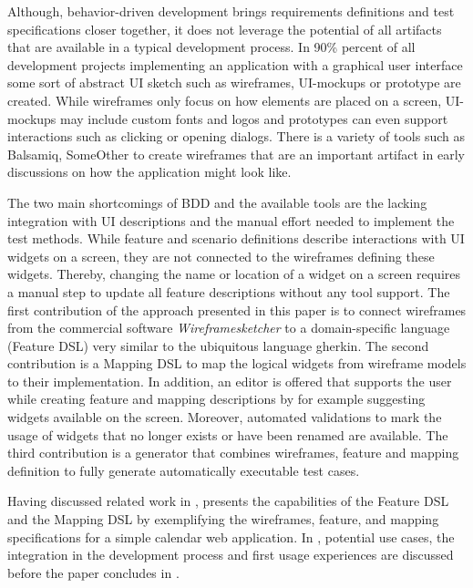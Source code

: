 \documentclass{sig-alternate-05-2015}
\begin{document}
Although, behavior-driven development brings requirements definitions and test specifications closer together, it does not leverage the potential of all artifacts that are available in a typical development process.
In 90\% percent of all development projects implementing an application with a graphical user interface some sort of abstract UI sketch such as wireframes, UI-mockups or prototype are created.
While wireframes only focus on how elements are placed on a screen, UI-mockups may include custom fonts and logos and prototypes can even support interactions such as clicking or opening dialogs. 
There is a variety of tools such as Balsamiq, SomeOther to create wireframes that are an important artifact in early discussions on how the application might look like.

The two main shortcomings of BDD and the available tools are the lacking integration with UI descriptions and the manual effort needed to implement the test methods.
While feature and scenario definitions describe interactions with UI widgets on a screen, they are not connected to the wireframes defining these widgets.
Thereby, changing the name or location of a widget on a screen requires a manual step to update all feature descriptions without any tool support.
The first contribution of the approach presented in this paper is to connect  wireframes from the commercial software \textit{Wireframesketcher} to a domain-specific language (Feature DSL) very similar to the ubiquitous language gherkin. 
The second contribution is a Mapping DSL to map the logical widgets from wireframe models to their implementation.
In addition, an editor is offered that supports the user while creating feature and mapping descriptions by for example suggesting widgets available on the screen.
Moreover, automated validations to mark the usage of widgets that no longer exists or have been renamed are available.
The third contribution is a generator that combines wireframes, feature and mapping definition to fully generate automatically executable test cases.

Having discussed related work in ,  presents the capabilities of the Feature DSL and the Mapping DSL by exemplifying the wireframes, feature, and mapping specifications for a simple calendar web application.
In , potential use cases, the integration in the development process and first usage experiences are discussed before the paper concludes in .
\end{document}

